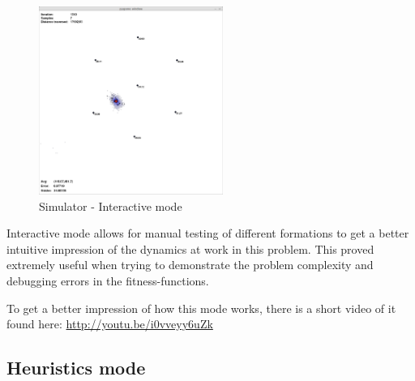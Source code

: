 \documentclass[10pt,a4paper]{book}
\begin{document}
\begin{figure}[H]
\begin{minipage}{60mm}
\end{minipage}%
\begin{minipage}{60mm}
  \centering
	\includegraphics[width=60mm]{interactive4.png}
\end{minipage}
\caption{Simulator - Interactive mode}
\label{simulator_interactive}
\end{figure}


Interactive mode allows for manual testing of different formations to get a better intuitive impression of the dynamics at work in this problem. This proved extremely useful when trying to demonstrate the problem complexity and debugging errors in the fitness-functions.


To get a better impression of how this mode works, there is a short video of it found here: \url{http://youtu.be/i0vveyy6uZk}


\subsection{Heuristics mode}
\end{document}
